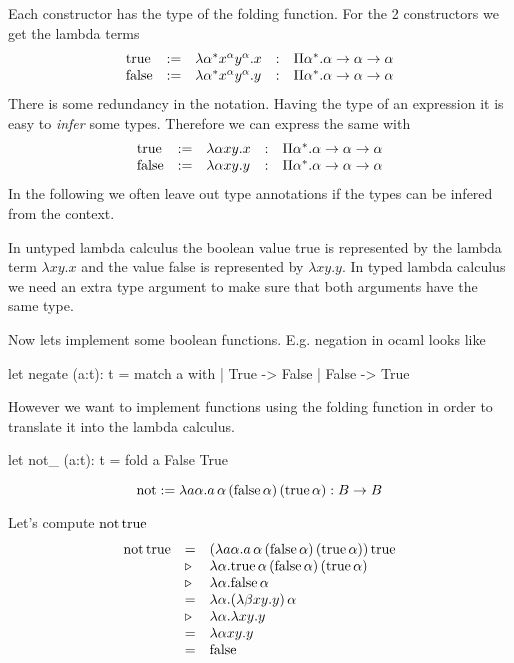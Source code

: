 Each constructor has the type of the folding function. For the 2 constructors
we get the lambda terms
%
$$
\begin{array}{lllll}
  \text{true}
  &:=& \lambda \alpha^* x^\alpha y^\alpha . x
  &:& \Pi \alpha^*. \alpha \to \alpha \to \alpha
  \\
  \text{false}
  &:=& \lambda \alpha^* x^\alpha y^\alpha . y
  &:& \Pi \alpha^*. \alpha \to \alpha \to \alpha
\end{array}
$$
%
There is some redundancy in the notation. Having the type of an expression it
is easy to \emph{infer} some types. Therefore we can express the same with
%
$$
\begin{array}{lllll}
  \text{true}
  &:=& \lambda \alpha x y . x
  &:& \Pi \alpha^*. \alpha \to \alpha \to \alpha
  \\
  \text{false}
  &:=& \lambda \alpha x y . y
  &:& \Pi \alpha^*. \alpha \to \alpha \to \alpha
\end{array}
$$
%
In the following we often leave out type annotations if the types can be
infered from the context.


In untyped lambda calculus the boolean value true is represented by the lambda
term $\lambda x y. x$ and the value false is represented by $\lambda x y
.y$. In typed lambda calculus we need an extra type argument to make sure that
both arguments have the same type.


Now lets implement some boolean functions. E.g. negation in ocaml looks like
\begin{ocaml}
  let negate (a:t): t =
     match a with
     | True  -> False
     | False -> True
\end{ocaml}
%
However we want to implement functions using the folding function in order to
translate it into the lambda calculus.
%
\begin{ocaml}
  let not_ (a:t): t =
     fold a False True
\end{ocaml}

$$
\text{not}
:= \lambda a \alpha .
  a \, \alpha \, (\text{false}\,\alpha) \, (\text{true} \, \alpha)
: B \to B
$$

Let's compute $\text{not} \, \text{true}$
$$
%
\begin{array}{lll}
  \text{not} \, \true
  &=
  & (\lambda a \alpha .
    a \, \alpha \, (\false\,\alpha) \, (\true \, \alpha)) \,
    \true
  \\
  & \reduce
  & \lambda \alpha .
    \true \, \alpha \, (\false\,\alpha) \, (\true \,
    \alpha)
  \\
  & \reduce
  & \lambda \alpha. \false\,\alpha
  \\
  & =
  & \lambda \alpha . (\lambda \beta x y. y) \, \alpha
  \\
  & \reduce & \lambda \alpha . \lambda x y . y
  \\
  & = & \lambda \alpha x y . y
  \\
  & = & \false
\end{array}
$$


